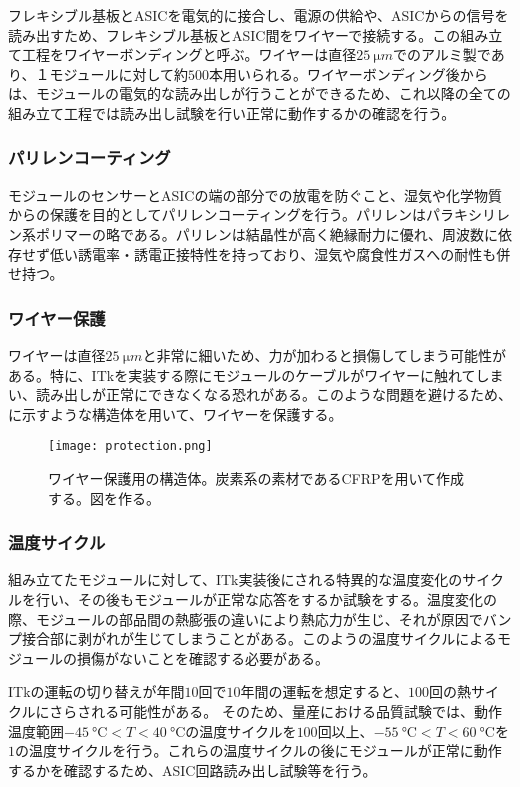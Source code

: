 フレキシブル基板とASICを電気的に接合し、電源の供給や、ASICからの信号を読み出すため、フレキシブル基板とASIC間をワイヤーで接続する。この組み立て工程をワイヤーボンディングと呼ぶ。ワイヤーは直径$25\ \si{\micro m}$でのアルミ製であり、１モジュールに対して約$500$本用いられる。ワイヤーボンディング後からは、モジュールの電気的な読み出しが行うことができるため、これ以降の全ての組み立て工程では読み出し試験を行い正常に動作するかの確認を行う。

\subsubsection*{パリレンコーティング}

モジュールのセンサーとASICの端の部分での放電を防ぐこと、湿気や化学物質からの保護を目的としてパリレンコーティングを行う。パリレンはパラキシリレン系ポリマーの略である。パリレンは結晶性が高く絶縁耐力に優れ、周波数に依存せず低い誘電率・誘電正接特性を持っており、湿気や腐食性ガスへの耐性も併せ持つ。


\subsubsection*{ワイヤー保護}

ワイヤーは直径$25\ \si{\micro m}$と非常に細いため、力が加わると損傷してしまう可能性がある。特に、ITkを実装する際にモジュールのケーブルがワイヤーに触れてしまい、読み出しが正常にできなくなる恐れがある。このような問題を避けるため、に示すような構造体を用いて、ワイヤーを保護する。

\begin{figure}[tbp]
  \centering
  \texttt{[image: protection.png]}
  \caption[ワイヤー保護用の構造体]{ワイヤー保護用の構造体。炭素系の素材であるCFRPを用いて作成する。図を作る。 }
  \label{fig:protection}
\end{figure}

\subsubsection*{温度サイクル}


組み立てたモジュールに対して、ITk実装後にされる特異的な温度変化のサイクルを行い、その後もモジュールが正常な応答をするか試験をする。温度変化の際、モジュールの部品間の熱膨張の違いにより熱応力が生じ、それが原因でバンプ接合部に剥がれが生じてしまうことがある。このようの温度サイクルによるモジュールの損傷がないことを確認する必要がある。

ITkの運転の切り替えが年間$10$回で$10$年間の運転を想定すると、$100$回の熱サイクルにさらされる可能性がある。
そのため、量産における品質試験では、動作温度範囲$-45\ \si{\degreeCelsius}<T<40\ \si{\degreeCelsius}$の温度サイクルを$100$回以上、$-55\ \si{\degreeCelsius}<T<60\ \si{\degreeCelsius}$を$1$の温度サイクルを行う。これらの温度サイクルの後にモジュールが正常に動作するかを確認するため、ASIC回路読み出し試験等を行う。

